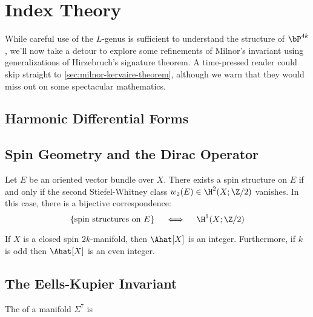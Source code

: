 \section{Index Theory}
While careful use of the $L$-genus is sufficient to understand the structure of $\bP^{4k}$, we'll now take a detour to explore some refinements of Milnor's invariant using generalizations of Hirzebruch's signature theorem. A time-pressed reader could skip straight to \cref{sec:milnor-kervaire-theorem}, although we warn that they would miss out on some spectacular mathematics.

\subsection{Harmonic Differential Forms}


\subsection{Spin Geometry and the Dirac Operator}


\begin{theorem}
	Let $E$ be an oriented vector bundle over $X$. There exists a spin structure on $E$ if and only if the second Stiefel-Whitney class $w_2(E)\in \H^2(X;\Z/2)$ vanishes. In this case, there is a bijective correspondence:
	\[
		\left\{
		\parbox{9em}{
			spin structures on $E$
		}
		\right\}
		\quad\iff\quad
		\H^1(X;\Z/2)
	\]
\end{theorem}

\begin{theorem}\label{thm:Ahat-integrality}
	If $X$ is a closed spin $2k$-manifold, then $\Ahat[X]$ is an integer. Furthermore, if $k$ is odd then $\Ahat[X]$ is an even integer.
\end{theorem}

\subsection{The Eells-Kupier Invariant}\label{sec:eells-kupier-invariant}


\begin{definition}
	The  of a manifold $\Sigma^7$ is
\end{definition}

